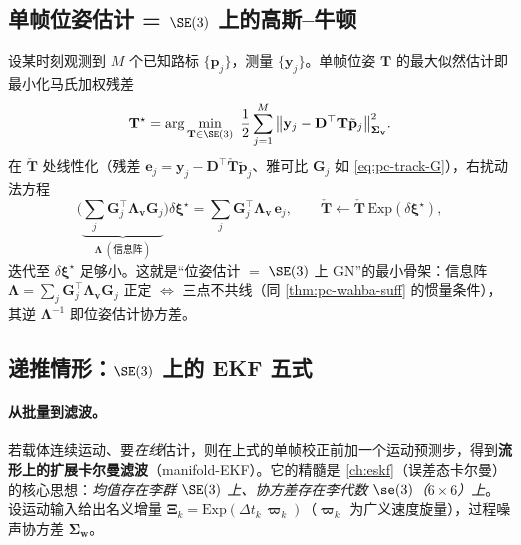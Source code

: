 \subsection{单帧位姿估计 = \texorpdfstring{$\SE(3)$}{(3)} 上的高斯--牛顿}
\label{sec:pc-track-gn}

\begin{derivation}[多点观测的单帧位姿 GN]
设某时刻观测到 $M$ 个已知路标 $\{\mathbf{p}_j\}$，测量 $\{\mathbf{y}_j\}$。单帧位姿 $\mathbf{T}$ 的最大似然估计即最小化马氏加权残差
\begin{equation}
  \mathbf{T}^\star=\arg\min_{\mathbf{T}\in\SE(3)}\ \frac12\sum_{j=1}^{M}\big\|\mathbf{y}_j-\mathbf{D}^\top\mathbf{T}\tilde{\mathbf{p}}_j\big\|_{\boldsymbol{\Sigma}_{\mathbf v}}^2.
  \label{eq:pc-track-cost}
\end{equation}
在 $\check{\mathbf{T}}$ 处线性化（残差 $\mathbf{e}_j=\mathbf{y}_j-\mathbf{D}^\top\check{\mathbf{T}}\tilde{\mathbf{p}}_j$、雅可比 $\mathbf{G}_j$ 如 \cref{eq:pc-track-G}），右扰动法方程
\begin{equation}
  \Big(\underbrace{\textstyle\sum_j\mathbf{G}_j^\top\boldsymbol{\Lambda}_{\mathbf v}\mathbf{G}_j}_{\boldsymbol{\Lambda}\ (\text{信息阵})}\Big)\delta\boldsymbol{\xi}^\star
  =\sum_j\mathbf{G}_j^\top\boldsymbol{\Lambda}_{\mathbf v}\,\mathbf{e}_j,
  \qquad \check{\mathbf{T}}\leftarrow\check{\mathbf{T}}\,\mathrm{Exp}(\delta\boldsymbol{\xi}^\star),
  \label{eq:pc-track-normal}
\end{equation}
迭代至 $\delta\boldsymbol{\xi}^\star$ 足够小。这就是“位姿估计 $=$ $\SE(3)$ 上 GN”的最小骨架：信息阵 $\boldsymbol{\Lambda}=\sum_j\mathbf{G}_j^\top\boldsymbol{\Lambda}_{\mathbf v}\mathbf{G}_j$ 正定 $\iff$ 三点不共线（同 \cref{thm:pc-wahba-suff} 的惯量条件），其逆 $\boldsymbol{\Lambda}^{-1}$ 即位姿估计协方差。
\end{derivation}

\subsection{递推情形：\texorpdfstring{$\SE(3)$}{(3)} 上的 EKF 五式}
\label{sec:pc-track-ekf}

\paragraph{从批量到滤波。}若载体连续运动、要\emph{在线}估计，则在上式的单帧校正前加一个运动预测步，得到\textbf{流形上的扩展卡尔曼滤波}（manifold-EKF）。它的精髓是 \cref{ch:eskf}（误差态卡尔曼）的核心思想：\emph{均值存在李群 $\SE(3)$ 上、协方差存在李代数 $\se(3)$（$6\times6$）上}。设运动输入给出名义增量 $\boldsymbol{\Xi}_k=\mathrm{Exp}(\Delta t_k\,\boldsymbol{\varpi}_k)$（$\boldsymbol{\varpi}_k$ 为广义速度旋量），过程噪声协方差 $\boldsymbol{\Sigma}_{\mathbf w}$。

